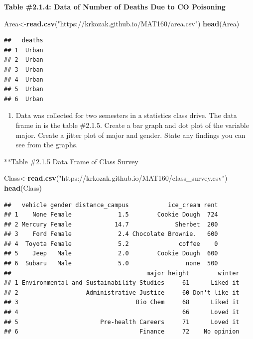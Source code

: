 \documentclass[]{book}
\newenvironment{Shaded}{\begin{snugshade}}{\end{snugshade}}
\newcommand{\KeywordTok}[1]{\textcolor[rgb]{0.13,0.29,0.53}{\textbf{#1}}}
\newcommand{\NormalTok}[1]{#1}
\newcommand{\StringTok}[1]{\textcolor[rgb]{0.31,0.60,0.02}{#1}}
\providecommand{\tightlist}{%
  \setlength{\itemsep}{0pt}\setlength{\parskip}{0pt}}
\begin{document}
\textbf{Table \#2.1.4: Data of Number of Deaths Due to CO Poisoning}

\begin{Shaded}
\begin{Highlighting}[]
\NormalTok{Area<-}\KeywordTok{read.csv}\NormalTok{(}\StringTok{"https://krkozak.github.io/MAT160/area.csv"}\NormalTok{)}
\KeywordTok{head}\NormalTok{(Area)}
\end{Highlighting}
\end{Shaded}

\begin{verbatim}
##   deaths
## 1  Urban
## 2  Urban
## 3  Urban
## 4  Urban
## 5  Urban
## 6  Urban
\end{verbatim}

\begin{enumerate}
\def\labelenumi{\arabic{enumi}.}
\setcounter{enumi}{3}
\tightlist
\item
  Data was collected for two semesters in a statistics class drive. The data frame in is the table \#2.1.5. Create a bar graph and dot plot of the variable major. Create a jitter plot of major and gender. State any findings you can see from the graphs.
\end{enumerate}

**Table \#2.1.5 Data Frame of Class Survey

\begin{Shaded}
\begin{Highlighting}[]
\NormalTok{Class<-}\KeywordTok{read.csv}\NormalTok{(}\StringTok{"https://krkozak.github.io/MAT160/class_survey.csv"}\NormalTok{)}
\KeywordTok{head}\NormalTok{(Class)}
\end{Highlighting}
\end{Shaded}

\begin{verbatim}
##   vehicle gender distance_campus           ice_cream rent
## 1    None Female             1.5        Cookie Dough  724
## 2 Mercury Female            14.7             Sherbet  200
## 3    Ford Female             2.4 Chocolate Brownie.   600
## 4  Toyota Female             5.2              coffee    0
## 5    Jeep   Male             2.0        Cookie Dough  600
## 6  Subaru   Male             5.0                none  500
##                                      major height        winter
## 1 Environmental and Sustainability Studies     61      Liked it
## 2                   Administrative Justice     60 Don't like it
## 3                                 Bio Chem     68      Liked it
## 4                                              66      Loved it
## 5                       Pre-health Careers     71      Loved it
## 6                                  Finance     72    No opinion
\end{verbatim}
\end{document}
